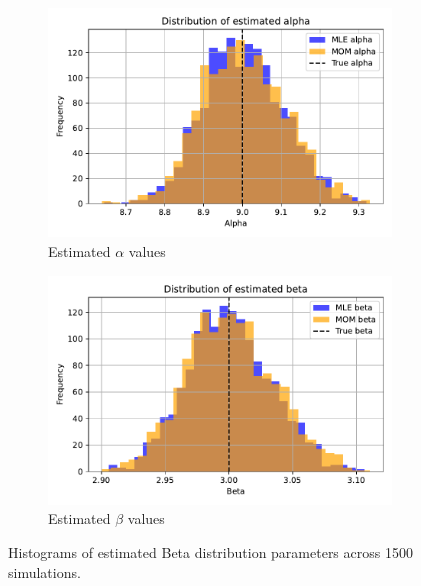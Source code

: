 \begin{figure}[H]
    \centering
    \begin{subfigure}[b]{0.48\textwidth}
        \centering
        \includegraphics[width=\textwidth]{resources/figures/q11a-estimated_alpha_histogram.pdf}
        \caption{Estimated \(\alpha\) values}
        \label{fig:alpha_hist}
    \end{subfigure}
    \hfill
    \begin{subfigure}[b]{0.48\textwidth}
        \centering
        \includegraphics[width=\textwidth]{resources/figures/q11a-estimated_beta_histogram.pdf}
        \caption{Estimated \(\beta\) values}
        \label{fig:beta_hist}
    \end{subfigure}
    \caption{Histograms of estimated Beta distribution parameters across 1500 simulations.} %
    \label{fig:q11a-beta_parameter_estimations}
\end{figure}


